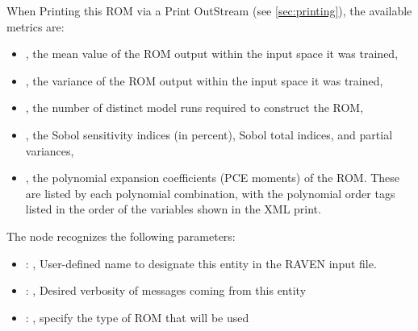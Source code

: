   When Printing this ROM via a Print OutStream (see \ref{sec:printing}), the available metrics are:
  \begin{itemize}                           \item {}, the mean value of the ROM output
  within the input space it was trained,                           \item {}, the
  variance of the ROM output within the input space it was trained,                           \item
  , the number of distinct model runs required to construct the ROM,
  \item {}, the Sobol sensitivity indices (in percent), Sobol total indices, and
  partial variances,                           \item {}, the polynomial
  expansion coefficients (PCE moments) of the ROM.  These are                             listed by
  each polynomial combination, with the polynomial order tags listed in the order of the variables
  shown in the XML print.                         \end{itemize}

  The  node recognizes the following parameters:
    \begin{itemize}
      \item {}: ,
        User-defined name to designate this entity in the RAVEN input file.
      \item {}: ,
        Desired verbosity of messages coming from this entity
      \item {}: ,
        specify the type of ROM that will be used
  \end{itemize}

